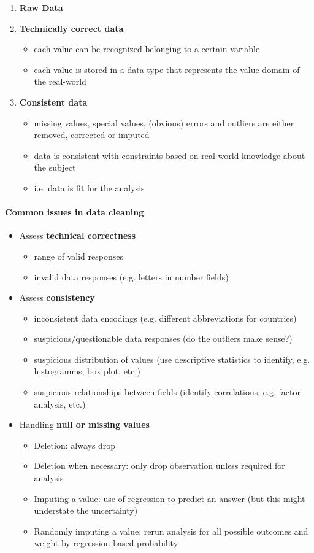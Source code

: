 \documentclass[a4paper, landscape, 6pt, fleqn]{scrartcl}
\renewcommand{\emph}[1]{\textbf{#1}}
\begin{document}
\begin{multicols*}{4}
\begin{enumerate}
\item \emph{Raw Data}
\item \emph{Technically correct data}
\begin{itemize}
\item each value can be recognized belonging to a certain variable
\item each value is stored in a data type that represents the value domain of the real-world
\end{itemize}
\item \emph{Consistent data}
\begin{itemize}
\item missing values, special values, (obvious) errors and outliers are either removed, corrected or imputed
\item data is consistent with constraints based on real-world knowledge about the subject
\item i.e. data is fit for the analysis
\end{itemize}
\end{enumerate}

\paragraph{Common issues in data cleaning}

\begin{itemize}
\item Assess \emph{technical correctness}
\begin{itemize}
\item range of valid responses
\item invalid data responses (e.g. letters in number fields)
\end{itemize}
\item Assess \emph{consistency}
\begin{itemize}
\item inconsistent data encodings (e.g. different abbreviations for countries)
\item suspicious/questionable data responses (do the outliers make sense?)
\item suspicious distribution of values (use descriptive statistics to identify, e.g. histogramms, box plot, etc.)
\item suspicious relationships between fields (identify correlations, e.g. factor analysis, etc.)
\end{itemize}
\item Handling \emph{null or missing values}
\begin{itemize}
\item Deletion: always drop
\item Deletion when necessary: only drop observation unless required for analysis
\item Imputing a value: use of regression to predict an answer (but this might understate the uncertainty)
\item Randomly imputing a value: rerun analysis for all possible outcomes and weight by regression-based probability
\end{itemize}
\end{itemize}


\end{multicols*}
\end{document}

